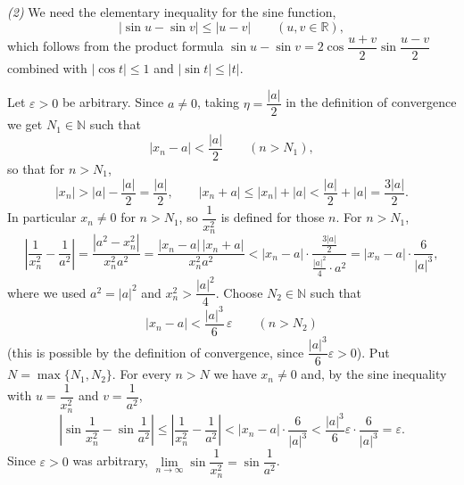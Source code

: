 \documentclass[11pt,a4paper]{article}
\newenvironment{solution}[1]{%
  \par\addvspace{1.7ex}%
  \noindent{\color{solutioncolor}\textbf{#1}}\hspace{0.55em}\ignorespaces}%
  {\par\addvspace{0.9ex}}
\begin{document}
\begin{solution}{Solution 2.1.8}
\emph{(2)} We need the elementary inequality for the sine function,
\[
|\sin u-\sin v|\le|u-v|\qquad(u,v\in\mathbb{R}),
\]
which follows from the product formula $\sin u-\sin v=2\cos\dfrac{u+v}{2}\sin\dfrac{u-v}{2}$ combined with $|\cos t|\le 1$ and $|\sin t|\le|t|$.

Let $\varepsilon>0$ be arbitrary. Since $a\ne 0$, taking $\eta=\dfrac{|a|}{2}$ in the definition of convergence we get $N_1\in\mathbb{N}$ such that
\[
|x_n-a|<\frac{|a|}{2}\qquad(n>N_1),
\]
so that for $n>N_1$,
\[
|x_n|>|a|-\frac{|a|}{2}=\frac{|a|}{2},\qquad
|x_n+a|\le|x_n|+|a|<\frac{|a|}{2}+|a|=\frac{3|a|}{2}.
\]
In particular $x_n\ne 0$ for $n>N_1$, so $\dfrac{1}{x_n^2}$ is defined for those $n$. For $n>N_1$,
\[
\left|\frac{1}{x_n^2}-\frac{1}{a^2}\right|
=\frac{|a^2-x_n^2|}{x_n^2a^2}
=\frac{|x_n-a|\,|x_n+a|}{x_n^2a^2}
<|x_n-a|\cdot\frac{\frac{3|a|}{2}}{\frac{|a|^2}{4}\cdot a^2}
=|x_n-a|\cdot\frac{6}{|a|^3},
\]
where we used $a^2=|a|^2$ and $x_n^2>\dfrac{|a|^2}{4}$. Choose $N_2\in\mathbb{N}$ such that
\[
|x_n-a|<\frac{|a|^3}{6}\,\varepsilon\qquad(n>N_2)
\]
(this is possible by the definition of convergence, since $\dfrac{|a|^3}{6}\varepsilon>0$). Put $N=\max\{N_1,N_2\}$. For every $n>N$ we have $x_n\ne 0$ and, by the sine inequality with $u=\dfrac{1}{x_n^2}$ and $v=\dfrac{1}{a^2}$,
\[
\left|\sin\frac{1}{x_n^2}-\sin\frac{1}{a^2}\right|
\le\left|\frac{1}{x_n^2}-\frac{1}{a^2}\right|
<|x_n-a|\cdot\frac{6}{|a|^3}
<\frac{|a|^3}{6}\varepsilon\cdot\frac{6}{|a|^3}
=\varepsilon .
\]
Since $\varepsilon>0$ was arbitrary, $\lim\limits_{n\to\infty}\sin\dfrac{1}{x_n^2}=\sin\dfrac{1}{a^2}$.
\end{solution}
\end{document}
